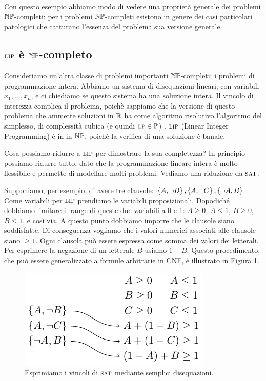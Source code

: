 Con questo esempio abbiamo modo di vedere una proprietà generale dei problemi $\mathbb{NP}$-completi:
per i problemi $\mathbb{NP}$-completi esistono in genere dei casi particolari patologici che catturano
l'essenza del problema sua versione generale.

\subsection{$\textsc{lip}$ è $\mathbb{NP}$-completo}

Consideriamo un'altra classe di problemi importanti $\mathbb{NP}$-completi: i problemi di
programmazione intera. Abbiamo un sistema di disequazioni lineari, con variabili
$x_{1},\dotsc,x_{n}$, e ci chiediamo se questo sistema ha una soluzione intera. Il vincolo di
interezza complica il problema, poichè sappiamo che la versione di questo problema che ammette
soluzioni in $\mathbb{R}$ ha come algoritmo risolutivo l'algoritmo del simplesso, di complessità cubica
(e quindi $\textsc{lp} \in \mathbb{P}$) . $\textsc{lip}$ (Linear Integer Programming) è in in $\mathbb{NP}$, poichè la
verifica di una soluzione è banale.

Cosa possiamo ridurre a $\textsc{lip}$ per dimostrare la sua completezza? In principio possiamo ridurre
tutto, dato che la programmazione lineare intera è molto flessibile e permette di modellare molti
problemi. Vediamo una riduzione da $\textsc{sat}$.

Supponiamo, per esempio, di avere tre clausole: $\left\{A,\lnot B\right\},\left\{A,\lnot C\right\},\left\{\lnot A,B\right\}$.
Come variabili per $\textsc{lip}$ prendiamo le variabili proposizionali. Dopodiché dobbiamo limitare il
range di queste due variabili a 0 e 1: $A \geq 0$, $A \leq 1$, $B \geq 0$, $B \leq 1$, e così via.
A questo punto dobbiamo imporre che le clausole siano soddisfatte. Di conseguenza vogliamo che i
valori numerici associati alle clausole siano $\geq 1$. Ogni clausola può essere espressa come
somma dei valori dei letterali. Per esprimere la negazione di un letterale $B$ usiamo $1 - B$.
Questo procedimento, che può essere generalizzato a formule arbitrarie in CNF, è illustrato in
Figura \ref{img:SATLIP}.

\begin{figure}[h]
    \begin{center}
        \includegraphics{./img/NPClass/SATLIP.pdf}
        \caption{Esprimiamo i vincoli di $\textsc{sat}$ mediante semplici disequazioni.}
        \label{img:SATLIP}
    \end{center}
\end{figure}

